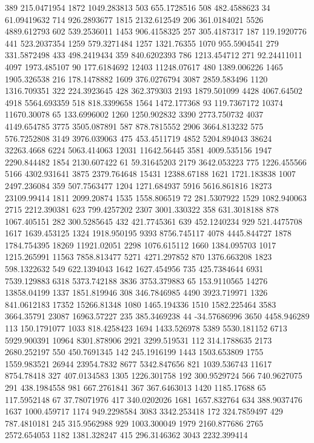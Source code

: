 389	215.0471954
1872	1049.283813
503	655.1728516
508	482.4588623
34	61.09419632
714	926.2893677
1815	2132.612549
206	361.0184021
5526	4889.612793
602	539.2536011
1453	906.4158325
257	305.4187317
187	119.1920776
441	523.2037354
1259	579.3271484
1257	1321.76355
1070	955.5904541
279	331.5872498
433	498.2419434
359	840.6202393
786	1213.454712
271	92.24411011
4097	1973.485107
90	177.6184692
12403	11248.07617
480	1389.006226
1465	1905.326538
216	178.1478882
1609	376.0276794
3087	2859.583496
1120	1316.709351
322	224.3923645
428	362.379303
2193	1879.501099
4428	4067.64502
4918	5564.693359
518	818.3399658
1564	1472.177368
93	119.7367172
10374	11670.30078
65	133.6996002
1260	1250.902832
3390	2773.750732
4037	4149.654785
3775	3505.087891
587	878.7815552
2906	3664.813232
575	576.7252808
3149	3976.039063
475	453.4511719
4852	5204.894043
38624	32263.4668
6224	5063.414063
12031	11642.56445
3581	4009.535156
1947	2290.844482
1854	2130.607422
61	59.31645203
2179	3642.053223
775	1226.455566
5166	4302.931641
3875	2379.764648
15431	12388.67188
1621	1721.183838
1007	2497.236084
359	507.7563477
1204	1271.684937
5916	5616.861816
18273	23109.99414
1811	2099.20874
1535	1558.806519
72	281.5307922
1529	1082.940063
2715	2212.390381
623	799.4257202
2307	3001.330322
358	631.3018188
878	1067.405151
282	300.5285645
432	421.7745361
639	452.1240234
929	521.4475708
1617	1639.453125
1324	1918.950195
9393	8756.745117
4078	4445.844727
1878	1784.754395
18269	11921.02051
2298	1076.615112
1660	1384.095703
1017	1215.265991
11563	7858.813477
5271	4271.297852
870	1376.663208
1823	598.1322632
549	622.1394043
1642	1627.454956
735	425.7384644
6931	7539.129883
6318	5373.742188
3836	3753.379883
65	153.9110565
14276	13858.04199
1337	1851.819946
308	346.7846985
4490	3923.719971
1326	841.0612183
17352	15266.81348
1080	1465.194336
1510	1582.225464
3583	3664.35791
23087	16963.57227
235	385.3469238
44	-34.57686996
3650	4458.946289
113	150.1791077
1033	818.4258423
1694	1433.526978
5389	5530.181152
6713	5929.900391
10964	8301.878906
2921	3299.519531
112	314.1788635
2173	2680.252197
550	450.7691345
142	245.1916199
1443	1503.653809
1755	1559.983521
26944	23954.7832
8677	5342.847656
821	1039.536743
11617	8754.78418
327	407.0134583
1305	1226.301758
192	300.9529724
566	740.9627075
291	438.1984558
981	667.2761841
367	367.6463013
1420	1185.17688
65	117.5952148
67	37.78071976
417	340.0202026
1681	1657.832764
634	388.9037476
1637	1000.459717
1174	949.2298584
3083	3342.253418
172	324.7859497
429	787.4810181
245	315.9562988
929	1003.300049
1979	2160.877686
2765	2572.654053
1182	1381.328247
415	296.3146362
3043	2232.399414
